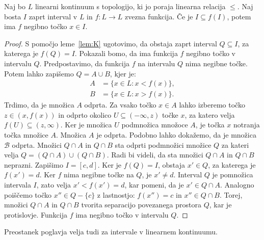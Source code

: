 \documentclass[../TG_magistrsko_delo_sections.tex]{subfiles}
\begin{document}
\begin{lema}
Naj bo $L$ linearni kontinuum s topologijo, ki jo poraja linearna relacija $\leq$. Naj bosta $I$ zaprt interval v $L$ in $f:L \to L$ zvezna funkcija. Če je $I \subseteq f(I)$, potem ima $f$ negibno točko $x \in I$.
\end{lema}
\begin{proof}
S pomočjo leme~\ref{lem:K} ugotovimo, da obstaja zaprt interval $Q \subseteq I$, za katerega je $f(Q) = I$. Pokazali bomo, da ima funkcija $f$ negibno točko v intervalu $Q$. Predpostavimo, da funkcija $f$ na intervalu $Q$ nima negibne točke. Potem lahko zapišemo $Q = A \cup B$, kjer je:
\begin{equation*} %
\begin{split}
A &= \{x \in L : x < f(x)\}, \\ 
B &= \{x \in L : x > f(x)\}.
\end{split}
\end{equation*}
Trdimo, da je množica $A$ odprta. Za vsako točko $x \in A$ lahko izberemo točko $z \in (x, f(x))$ in odprto okolico $U \subseteq  (-\infty, z)$ točke $x$, za katero velja $f(U) \subseteq (z, \infty)$. Ker je množica $U$ podmnožica množoce $A$, je točka $x$ notranja točka množice $A$. Množica $A$ je odprta. Podobno lahko dokažemo, da je množica $\mathcal{B}$ odprta. Množici $Q \cap A$ in $Q \cap B$ sta odprti podmnožici množice $Q$ za kateri velja $Q = (Q \cap A) \cup (Q \cap B)$. Radi bi videli, da sta množici $Q \cap A$ in $Q \cap B$ neprazni. Zapišimo $I = [c, d]$. Ker je $f(Q) = I$, obstaja $x' \in Q$, za katerega je $f(x') =d$. Ker $f$ nima negibne točke na $Q$, je $x' \neq d$. Interval $Q$ je pomnožica intervala $I$, zato velja $x' < f(x') = d$, kar pomeni, da je $x' \in Q \cap A$. Analogno poiščemo točko $x'' \in Q - \{c\}$ z lastnostjo: $f(x'') = c$ in $x'' \in Q \cap B$. Torej, množici $Q \cap A$ in $Q \cap B$ tvorita separacijo povezanega prostora $Q$, kar je protislovje. Funkcija $f$ ima negibno točko v intervalu $Q$.
\end{proof}

Preostanek poglavja velja tudi za intervale v linearnem kontinuumu.
\end{document}
